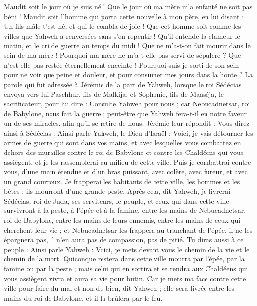 \begin{multicols}{2}
Maudit soit le jour où je suis né ! Que le jour où ma mère m'a enfanté ne soit pas béni !
Maudit soit l'homme qui porta cette nouvelle à mon père, en lui disant : Un fils mâle t'est né, et qui le combla de joie !
Que cet homme soit comme les villes que Yahweh a renversées sans s'en repentir ! Qu'il entende la clameur le matin, et le cri de guerre au temps du midi !
Que ne m'a-t-on fait mourir dans le sein de ma mère ! Pourquoi ma mère ne m'a-t-elle pas servi de sépulcre ? Que n'est-elle pas restée éternellement enceinte !
Pourquoi suis-je sorti de son sein pour ne voir que peine et douleur, et pour consumer mes jours dans la honte ?
\VerseOne{}La parole qui fut adressée à Jérémie de la part de Yahweh, lorsque le roi Sédécias envoya vers lui Paschhur, fils de Malkija, et Sophonie, fils de Maaséja, le sacrificateur, pour lui dire :
Consulte Yahweh pour nous ; car Nebucadnetsar, roi de Babylone, nous fait la guerre ; peut-être que Yahweh fera-t-il en notre faveur un de ses miracles, afin qu'il se retire de nous.
Jérémie leur répondit : Vous direz ainsi à Sédécias :
Ainsi parle Yahweh, le Dieu d'Israël : Voici, je vais détourner les armes de guerre qui sont dans vos mains, et avec lesquelles vous combattez en dehors des murailles contre le roi de Babylone et contre les Chaldéens qui vous assiègent, et je les rassemblerai au milieu de cette ville.
Puis je combattrai contre vous, d'une main étendue et d'un bras puissant, avec colère, avec fureur, et avec un grand courroux.
Je frapperai les habitants de cette ville, les hommes et les bêtes ; ils mourront d'une grande peste.
Après cela, dit Yahweh, je livrerai Sédécias, roi de Juda, ses serviteurs, le peuple, et ceux qui dans cette ville survivront à la peste, à l'épée et à la famine, entre les mains de Nebucadnetsar, roi de Babylone, entre les mains de leurs ennemis, entre les mains de ceux qui cherchent leur vie ; et Nebucadnetsar les frappera au tranchant de l'épée, il ne les épargnera pas, il n'en aura pas de compassion, pas de pitié.
Tu diras aussi à ce peuple : Ainsi parle Yahweh : Voici, je mets devant vous le chemin de la vie et le chemin de la mort.
Quiconque restera dans cette ville mourra par l'épée, par la famine ou par la peste ; mais celui qui en sortira et se rendra aux Chaldéens qui vous assiègent vivra et aura sa vie pour butin.
Car je mets ma face contre cette ville pour faire du mal et non du bien, dit Yahweh ; elle sera livrée entre les mains du roi de Babylone, et il la brûlera par le feu.

\end{multicols}
